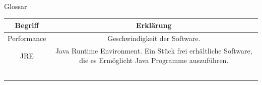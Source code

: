 \documentclass[11pt]{article}
\begin{document}
\pagebreak


\par
Glossar
\par
\begin{tabular}{|c|c|}
\hline
Begriff & Erklärung \\
    \hline
  Performance   & Geschwindigkeit der Software. \\
  \hline
JRE  & Java Runtime Environment. Ein Stück frei erhältliche Software, die es Ermöglicht Java Programme auszuführen. \\
    \hline
  & \\
    \hline
  & \\
    \hline
  & \\
    \hline
  & \\  
  \hline
  & \\
\end{tabular}
\end{document}
